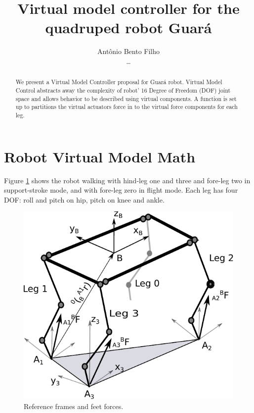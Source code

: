 \documentclass[]{article}
\title{Virtual model controller for the quadruped robot Guar\'a}
\author{Antônio Bento Filho\\\dots}
\begin{document}
\maketitle

\begin{abstract}
We present a Virtual Model Controller \cite{pratt_virtual_1996} proposal for Guará robot. Virtual Model Control abstracts away the complexity of robot' 16 Degree of Freedom (DOF) joint space and allows behavior to be described using virtual components. A function is set up to partitions the virtual actuators force in to the virtual force components for each leg.
\end{abstract}
\section{Robot Virtual Model Math}
Figure \ref{fig:guarawolflegs} shows the robot walking with hind-leg one and three  and fore-leg two in support-stroke mode, and with fore-leg zero in flight mode. Each leg has four DOF: roll and pitch on hip, pitch on knee and ankle. 	
\begin{figure}%
	\centering
	\includegraphics[scale=0.5]{"Figuras/GuaraWolfLegs"}
	\caption{Reference frames and feet forces.}
	\label{fig:guarawolflegs}
\end{figure}
\end{document}
